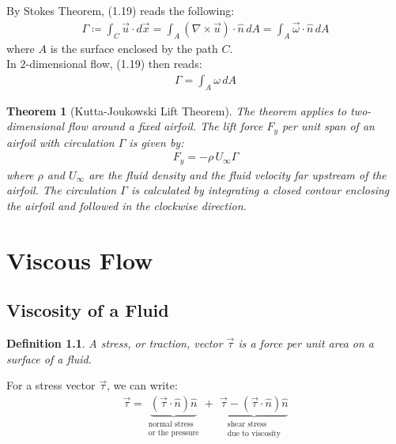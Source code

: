 \documentclass[11pt]{book}
\theoremstyle{break}
\theoremstyle{break}
\newtheorem{thm}{Theorem}[section]
\newtheorem{defn}{Definition}[corL]
\begin{document}
By Stokes Theorem, (1.19) reads the following:
\begin{align*}
\Gamma \coloneqq \int_C \vec{u} \cdot d\vec{x} = \int_A (\nabla \times \vec{u}) \cdot \hat{n}\, dA = \int_A \vec{\omega}\cdot \hat{n} \, dA
\end{align*}
where $A$ is the surface enclosed by the path $C$.\\
In $2$-dimensional flow, (1.19) then reads:
\begin{align*}
\Gamma = \int_A \omega \, dA \tag{2D Flow Circulation}
\end{align*}

\begin{thm}[Kutta-Joukowski Lift Theorem]
The theorem applies to two-dimensional flow around a fixed airfoil. The lift force $F_y$ per unit span of an airfoil with circulation $\Gamma$ is given by:
\begin{align*}
F_y = -\rho\, U_{\infty }\Gamma
\end{align*}
where $\rho$ and $U_{\infty}$ are the fluid density and the fluid velocity far upstream of the airfoil. The circulation $\Gamma$ is calculated by integrating a closed contour enclosing the airfoil and followed in the clockwise direction.
\end{thm}

\newpage
\chapter{Viscous Flow}
\setcounter{section}{4}
\section[Viscosity of a Fluid]{\color{red}Viscosity of a Fluid\color{black}}
\begin{defn}
A stress, or traction, vector $\vec{\tau}$ is a force per unit area on a surface of a fluid. 
\end{defn}

For a stress vector $\vec{\tau}$, we can write:
\begin{align*}
\vec{\tau} = \underbrace{(\vec{\tau}\cdot \hat{n}) \hat{n}}_{\substack{\text{normal stress}\\\text{or the pressure}}} + \ \,  \underbrace{\vec{\tau} - (\vec{\tau} \cdot \hat{n} ) \hat{n}}_{\substack{\text{shear stress}\\ \text{due to viscosity}}}
\end{align*}


\hfill\break
\hfill\break
\end{document}
